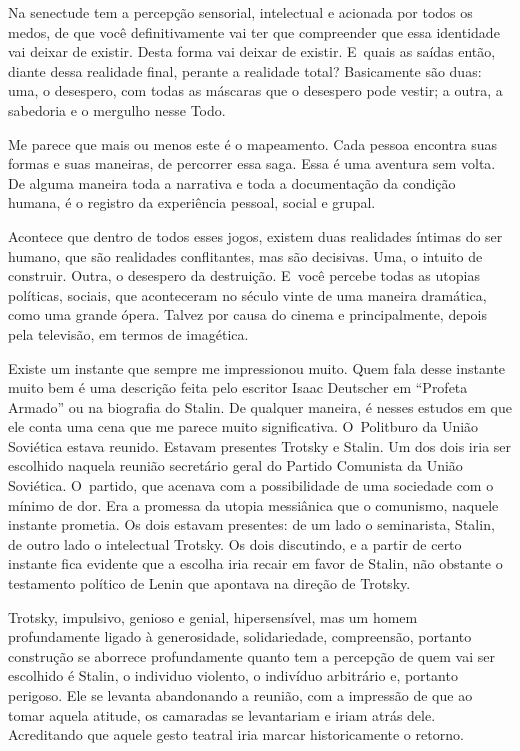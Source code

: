  

Na senectude tem a percepção sensorial, intelectual e acionada por todos
os medos, de que você definitivamente vai ter que compreender que essa
identidade vai deixar de existir. Desta forma vai deixar de existir. E~quais as saídas então, diante dessa realidade final, perante a realidade
total? Basicamente são duas: uma, o desespero, com todas as máscaras que
o desespero pode vestir; a outra, a sabedoria e o mergulho nesse Todo.

Me parece que mais ou menos este é o mapeamento. Cada pessoa encontra
suas formas e suas maneiras, de percorrer essa saga. Essa é uma aventura
sem volta. De alguma maneira toda a narrativa e toda a documentação da
condição humana, é o registro da experiência pessoal, social e grupal.

 

Acontece que dentro de todos esses jogos, existem duas realidades
íntimas do ser humano, que são realidades conflitantes, mas são
decisivas. Uma, o intuito de construir. Outra, o desespero da
destruição. E~você percebe todas as utopias políticas, sociais, que
aconteceram no século vinte de uma maneira dramática, como uma grande
ópera. Talvez por causa do cinema e principalmente, depois pela
televisão, em termos de imagética.

 

Existe um instante que sempre me impressionou muito. Quem fala desse
instante muito bem é uma descrição feita pelo escritor Isaac Deutscher
em ``Profeta Armado'' ou na biografia do Stalin. De qualquer maneira, é
nesses estudos em que ele conta uma cena que me parece muito
significativa. O~Politburo da União Soviética estava reunido. Estavam
presentes Trotsky e Stalin. Um dos dois iria ser escolhido naquela
reunião secretário geral do Partido Comunista da União Soviética. O~partido, que acenava com a possibilidade de uma sociedade com o mínimo
de dor. Era a promessa da utopia messiânica que o comunismo, naquele
instante prometia. Os dois estavam presentes: de um lado o seminarista,
Stalin, de outro lado o intelectual Trotsky. Os dois discutindo, e a
partir de certo instante fica evidente que a escolha iria recair em
favor de Stalin, não obstante o testamento político de Lenin que
apontava na direção de Trotsky.

 

Trotsky, impulsivo, genioso e genial, hipersensível, mas um homem
profundamente ligado à generosidade, solidariedade, compreensão,
portanto construção se aborrece profundamente quanto tem a percepção de
quem vai ser escolhido é Stalin, o individuo violento, o indivíduo
arbitrário e, portanto perigoso. Ele se levanta abandonando a reunião,
com a impressão de que ao tomar aquela atitude, os camaradas se
levantariam e iriam atrás dele. Acreditando que aquele gesto teatral
iria marcar historicamente o retorno.


